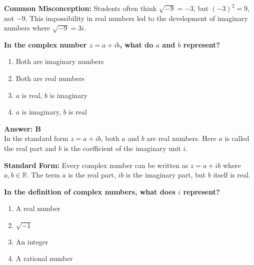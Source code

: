 \documentclass[12pt,a4paper]{article}
\begin{document}
\begin{conceptbox}
\textbf{Common Misconception:} Students often think \( \sqrt{-9} = -3 \), but \( (-3)^2 = 9 \), not \( -9 \). This impossibility in real numbers led to the development of imaginary numbers where \( \sqrt{-9} = 3i \).
\end{conceptbox}

\newpage

\begin{questiontitle}[MCQ 6]
\textbf{In the complex number \( z = a + ib \), what do \( a \) and \( b \) represent?}
\end{questiontitle}

\begin{partbox}[Options]
\begin{enumerate}[label=\Alph*.]
    \item Both are imaginary numbers
    \item Both are real numbers
    \item \( a \) is real, \( b \) is imaginary
    \item \( a \) is imaginary, \( b \) is real
\end{enumerate}
\end{partbox}

\begin{answerstyle}
\textbf{Answer: B} \\
In the standard form \( z = a + ib \), both \( a \) and \( b \) are real numbers. Here \( a \) is called the real part and \( b \) is the coefficient of the imaginary unit \( i \).
\end{answerstyle}

\begin{conceptbox}
\textbf{Standard Form:} Every complex number can be written as \( z = a + ib \) where \( a, b \in \mathbb{R} \). The term \( a \) is the real part, \( ib \) is the imaginary part, but \( b \) itself is real.
\end{conceptbox}

\newpage
\begin{questiontitle}[MCQ 7]
\textbf{In the definition of complex numbers, what does \( i \) represent?}
\end{questiontitle}

\begin{partbox}[Options]
\begin{enumerate}[label=\Alph*.]
    \item A real number
    \item \( \sqrt{-1} \)
    \item An integer
    \item A rational number
\end{enumerate}
\end{partbox}
\end{document}
